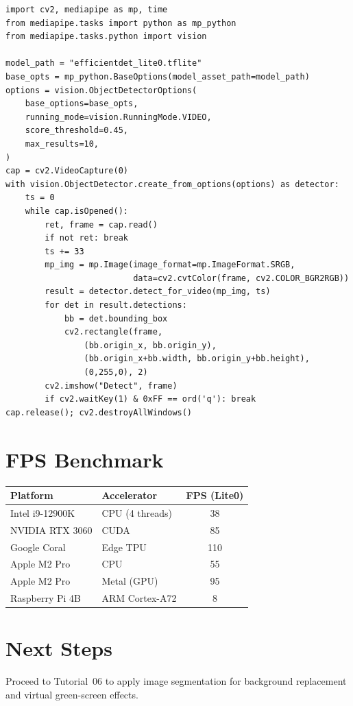 \documentclass[12pt,a4paper]{article}
\begin{document}
\begin{lstlisting}[caption={Tasks API object detector}]
import cv2, mediapipe as mp, time
from mediapipe.tasks import python as mp_python
from mediapipe.tasks.python import vision

model_path = "efficientdet_lite0.tflite"
base_opts = mp_python.BaseOptions(model_asset_path=model_path)
options = vision.ObjectDetectorOptions(
    base_options=base_opts,
    running_mode=vision.RunningMode.VIDEO,
    score_threshold=0.45,
    max_results=10,
)
cap = cv2.VideoCapture(0)
with vision.ObjectDetector.create_from_options(options) as detector:
    ts = 0
    while cap.isOpened():
        ret, frame = cap.read()
        if not ret: break
        ts += 33
        mp_img = mp.Image(image_format=mp.ImageFormat.SRGB,
                          data=cv2.cvtColor(frame, cv2.COLOR_BGR2RGB))
        result = detector.detect_for_video(mp_img, ts)
        for det in result.detections:
            bb = det.bounding_box
            cv2.rectangle(frame,
                (bb.origin_x, bb.origin_y),
                (bb.origin_x+bb.width, bb.origin_y+bb.height),
                (0,255,0), 2)
        cv2.imshow("Detect", frame)
        if cv2.waitKey(1) & 0xFF == ord('q'): break
cap.release(); cv2.destroyAllWindows()
\end{lstlisting}

\section{FPS Benchmark}

\begin{center}
\begin{tabular}{llc}
\toprule
\textbf{Platform} & \textbf{Accelerator} & \textbf{FPS (Lite0)} \\
\midrule
Intel i9-12900K   & CPU (4 threads)   & 38 \\
NVIDIA RTX 3060   & CUDA              & 85 \\
Google Coral      & Edge TPU          & 110 \\
Apple M2 Pro      & CPU               & 55 \\
Apple M2 Pro      & Metal (GPU)       & 95 \\
Raspberry Pi 4B   & ARM Cortex-A72    & 8  \\
\bottomrule
\end{tabular}
\end{center}

\section{Next Steps}

Proceed to Tutorial~06 to apply image segmentation for background replacement
and virtual green-screen effects.
\end{document}
